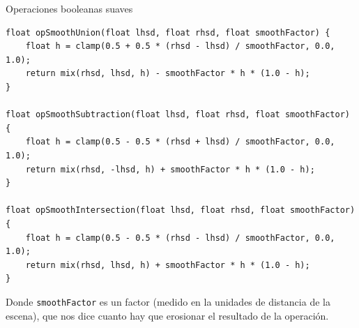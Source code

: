 \begin{frame}[fragile]{Operaciones booleanas suaves}
\begin{listing}
\begin{verbatim}
float opSmoothUnion(float lhsd, float rhsd, float smoothFactor) {
    float h = clamp(0.5 + 0.5 * (rhsd - lhsd) / smoothFactor, 0.0, 1.0);
    return mix(rhsd, lhsd, h) - smoothFactor * h * (1.0 - h);
}

float opSmoothSubtraction(float lhsd, float rhsd, float smoothFactor) {
    float h = clamp(0.5 - 0.5 * (rhsd + lhsd) / smoothFactor, 0.0, 1.0);
    return mix(rhsd, -lhsd, h) + smoothFactor * h * (1.0 - h);
}

float opSmoothIntersection(float lhsd, float rhsd, float smoothFactor) {
    float h = clamp(0.5 - 0.5 * (rhsd - lhsd) / smoothFactor, 0.0, 1.0);
    return mix(rhsd, lhsd, h) + smoothFactor * h * (1.0 - h);
}

\end{verbatim}
\end{listing}
Donde \texttt{smoothFactor} es un factor (medido en la unidades de distancia de la escena), que nos dice cuanto hay que \alert{erosionar} el resultado de la operación.
\end{frame}

